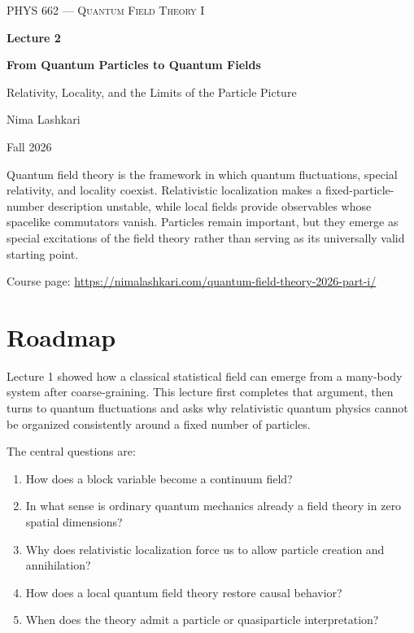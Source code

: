 \documentclass[11pt]{article}
\begin{document}

\begin{titlepage}
\centering
\vspace*{1.2in}
{\scshape\Large PHYS 662 --- Quantum Field Theory I\par}
\vspace{0.35in}
{\Huge\bfseries\color{qftblue} Lecture 2\par}
\vspace{0.15in}
{\LARGE\bfseries From Quantum Particles to Quantum Fields\par}
\vspace{0.12in}
{\Large\color{qftgreen} Relativity, Locality, and the Limits of the Particle Picture\par}
\vspace{0.6in}
{\large Nima Lashkari\par}
{\large Fall 2026\par}
\vfill
\begin{minipage}{0.86\textwidth}
\small
Quantum field theory is the framework in which quantum fluctuations, special
relativity, and locality coexist.  Relativistic localization makes a
fixed-particle-number description unstable, while local fields provide
observables whose spacelike commutators vanish.  Particles remain important,
but they emerge as special excitations of the field theory rather than serving
as its universally valid starting point.

\medskip
Course page: \url{https://nimalashkari.com/quantum-field-theory-2026-part-i/}
\end{minipage}
\vspace{0.5in}
\end{titlepage}

\tableofcontents
\newpage
{}

\section*{Roadmap}

Lecture 1 showed how a classical statistical field can emerge from a
many-body system after coarse-graining.  This lecture first completes that
argument, then turns to quantum fluctuations and asks why relativistic
quantum physics cannot be organized consistently around a fixed number of
particles.

The central questions are:
\begin{enumerate}
  \item How does a block variable become a continuum field?
  \item In what sense is ordinary quantum mechanics already a field theory in
  zero spatial dimensions?
  \item Why does relativistic localization force us to allow particle
  creation and annihilation?
  \item How does a local quantum field theory restore causal behavior?
  \item When does the theory admit a particle or quasiparticle
  interpretation?
\end{enumerate}
\end{document}
